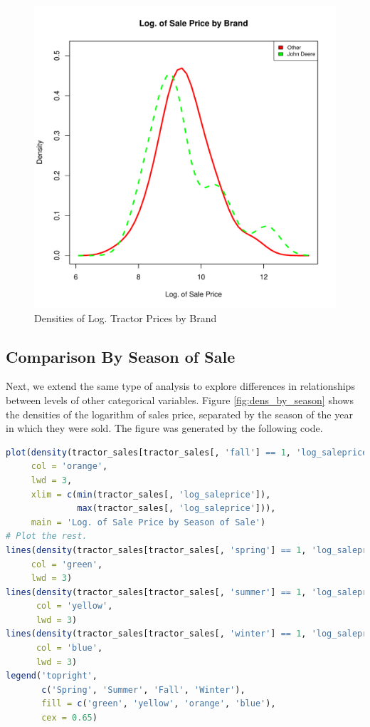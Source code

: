 \documentclass[11pt]{book}
\begin{document}
\begin{figure}[h!]
  \centering
  \includegraphics[scale = 0.5, keepaspectratio=true]{../Figures/dens_by_brand}
  \caption{Densities of Log. Tractor Prices by Brand} \label{fig:dens_by_brand}
\end{figure}


\pagebreak
\subsection{Comparison By Season of Sale}

Next, we extend the same type of analysis to explore 
differences in relationships between levels of other categorical variables. 
Figure \ref{fig:dens_by_season} shows
the densities of the logarithm of sales price,
separated by the season of the year in which they were sold.
The figure was generated by the following code.
%
\vfill

\begin{lstlisting}[language=R]
plot(density(tractor_sales[tractor_sales[, 'fall'] == 1, 'log_saleprice']),
     col = 'orange',
     lwd = 3,
     xlim = c(min(tractor_sales[, 'log_saleprice']),
              max(tractor_sales[, 'log_saleprice'])),
     main = 'Log. of Sale Price by Season of Sale')
# Plot the rest.
lines(density(tractor_sales[tractor_sales[, 'spring'] == 1, 'log_saleprice']),
     col = 'green',
     lwd = 3)
lines(density(tractor_sales[tractor_sales[, 'summer'] == 1, 'log_saleprice']),
      col = 'yellow',
      lwd = 3)
lines(density(tractor_sales[tractor_sales[, 'winter'] == 1, 'log_saleprice']),
      col = 'blue',
      lwd = 3)
legend('topright',
       c('Spring', 'Summer', 'Fall', 'Winter'),
       fill = c('green', 'yellow', 'orange', 'blue'),
       cex = 0.65)
\end{lstlisting}
\end{document}
